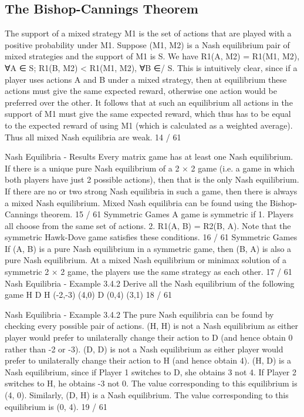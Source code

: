 \subsection{The Bishop-Cannings Theorem}
The support of a mixed strategy M1 is the set of actions that are
played with a positive probability under M1.
Suppose (M1, M2) is a Nash equilibrium pair of mixed strategies
and the support of M1 is S. We have
R1(A, M2) = R1(M1, M2), ∀A ∈ S; R1(B, M2) < R1(M1, M2), ∀B ∈/ S.
This is intuitively clear, since if a player uses actions A and B
under a mixed strategy, then at equilibrium these actions must give
the same expected reward, otherwise one action would be preferred
over the other.
It follows that at such an equilibrium all actions in the support of
M1 must give the same expected reward, which thus has to be
equal to the expected reward of using M1 (which is calculated as a
weighted average). Thus all mixed Nash equilibria are weak.
14 / 61

Nash Equilibria - Results
Every matrix game has at least one Nash equilibrium.
If there is a unique pure Nash equilibrium of a 2 × 2 game (i.e. a
game in which both players have just 2 possible actions), then that
is the only Nash equilibrium.
If there are no or two strong Nash equilibria in such a game, then
there is always a mixed Nash equilibrium.
Mixed Nash equilibria can be found using the Bishop-Cannings
theorem.
15 / 61
Symmetric Games
A game is symmetric if
1. Players all choose from the same set of actions.
2. R1(A, B) = R2(B, A).
Note that the symmetric Hawk-Dove game satisfies these
conditions.
16 / 61
Symmetric Games
If (A, B) is a pure Nash equilibrium in a symmetric game, then
(B, A) is also a pure Nash equilibrium.
At a mixed Nash equilibrium or minimax solution of a symmetric
2 × 2 game, the players use the same strategy as each other.
17 / 61
Nash Equilibria - Example 3.4.2
Derive all the Nash equilibrium of the following game
H D
H (-2,-3) (4,0)
D (0,4) (3,1)
18 / 61

Nash Equilibria - Example 3.4.2
The pure Nash equilibria can be found by checking every possible
pair of actions.
(H, H) is not a Nash equilibrium as either player would prefer to
unilaterally change their action to D (and hence obtain 0 rather
than -2 or -3).
(D, D) is not a Nash equilibrium as either player would prefer to
unilaterally change their action to H (and hence obtain 4).
(H, D) is a Nash equilibrium, since if Player 1 switches to D, she
obtains 3 not 4. If Player 2 switches to H, he obtains -3 not 0.
The value corresponding to this equilibrium is (4, 0).
Similarly, (D, H) is a Nash equilibrium. The value corresponding to
this equilibrium is (0, 4).
19 / 61

